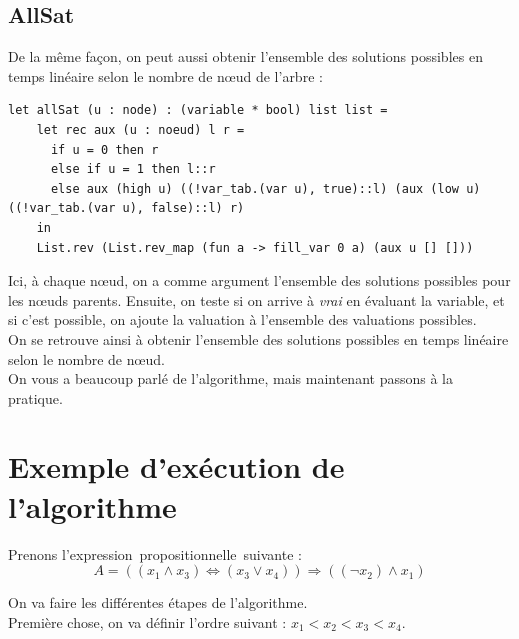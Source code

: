 \documentclass[a4paper, oneside]{report}
\newcommand{\expp}{expression~propositionnelle~}
\begin{document}
\subsection{AllSat}

De la même façon, on peut aussi obtenir l'ensemble des solutions possibles en temps linéaire selon le nombre de nœud de l'arbre :
\begin{lstlisting}
let allSat (u : node) : (variable * bool) list list =
    let rec aux (u : noeud) l r =
      if u = 0 then r
      else if u = 1 then l::r
      else aux (high u) ((!var_tab.(var u), true)::l) (aux (low u) ((!var_tab.(var u), false)::l) r)
    in 
    List.rev (List.rev_map (fun a -> fill_var 0 a) (aux u [] []))
\end{lstlisting}
Ici, à chaque nœud, on a comme argument l'ensemble des solutions possibles pour les nœuds parents. Ensuite, on teste si on arrive à \textit{vrai} en évaluant la variable, et si c'est possible, on ajoute la valuation à l'ensemble des valuations possibles.\\
On se retrouve ainsi à obtenir l'ensemble des solutions possibles en temps linéaire selon le nombre de nœud.\\

On vous a beaucoup parlé de l'algorithme, mais maintenant passons à la pratique.

\section{Exemple d'exécution de l'algorithme}

Prenons l'\expp suivante :
$$A = ((x_1 \wedge x_3) \Leftrightarrow (x_3 \vee x_4)) \Rightarrow ((\neg x_2) \wedge x_1)$$

On va faire les différentes étapes de l'algorithme.\\
Première chose, on va définir l'ordre suivant : $x_1 < x_2 < x_3 < x_4$.
\end{document}
